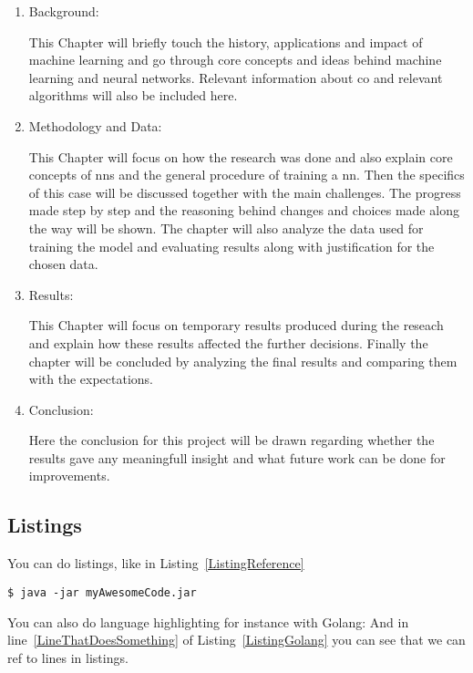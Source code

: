 \begin{enumerate}

\item Background:

This Chapter will briefly touch the history, applications and impact of machine learning and go through core concepts and ideas behind machine learning and neural networks. Relevant information about \gls{co} and relevant algorithms will also be included here.

\item Methodology and Data:

This Chapter will focus on how the research was done and also explain core concepts of \gls{nn}s and the general procedure of training a \gls{nn}. Then the specifics of this case will be discussed together with the main challenges. The progress made step by step and the reasoning behind changes and choices made along the way will be shown. The chapter will also analyze the data used for training the model and evaluating results along with justification for the chosen data.

\item Results:

This Chapter will focus on temporary results produced during the reseach and explain how these results affected the further decisions. Finally the chapter will be concluded by analyzing the final results and comparing them with the expectations.

\item Conclusion:

Here the conclusion for this project will be drawn regarding whether the results gave any meaningfull insight and what future work can be done for improvements.

\end{enumerate}

\subsection{Listings}
You can do listings, like in Listing~\ref{ListingReference}
\begin{lstlisting}[caption={[Short caption]Look at this cool listing. Find the rest in Appendix~\ref{Listing}},label=ListingReference]
$ java -jar myAwesomeCode.jar
\end{lstlisting}

You can also do language highlighting for instance with Golang:
And in line~\ref{LineThatDoesSomething} of Listing~\ref{ListingGolang} you can see that we can ref to lines in listings.

